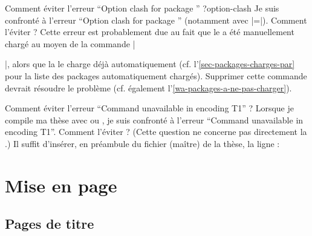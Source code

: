 \begin{dbfaq}{Comment éviter l'erreur \enquote{Option clash for package
      } ?}{option-clash}
  Je suis confronté à l'erreur \enquote{Option clash for package
    } (notamment avec |=|). Comment
  l'éviter ?
  \tcblower
  Cette erreur est probablement due au fait que le  a été
  manuellement chargé au moyen de la commande
  |\usepackage[...]{|\meta{package}|}|, alors que la \yatCl{} le charge déjà
  automatiquement (cf. l'\vref{sec-packages-charges-par} pour la liste des
  packages automatiquement chargés). Supprimer cette commande devrait résoudre
  le problème (cf. également l'\vref{wa-packages-a-ne-pas-charger}).
\end{dbfaq}

\begin{dbfaq}{Comment éviter l'erreur \enquote{Command
      \protect{} unavailable in encoding T1} ?}{}
  Lorsque je compile ma thèse avec  ou , je
  suis confronté à l'erreur \enquote{Command
     unavailable in encoding T1}. Comment
  l'éviter ?
  \tcblower
  (Cette question ne concerne pas directement la \yatCl{}.) Il suffit d'insérer,
  en préambule du fichier (maître) de la thèse, la
  ligne :
\begin{preamblecode}[title=Par exemple dans le \File{\configurationfile}]
\end{preamblecode}
\end{dbfaq}


\section{Mise en page}
\label{sec-mise-en-page}

\subsection{Pages de titre}
\label{sec-pages-de-titre}
%
%

